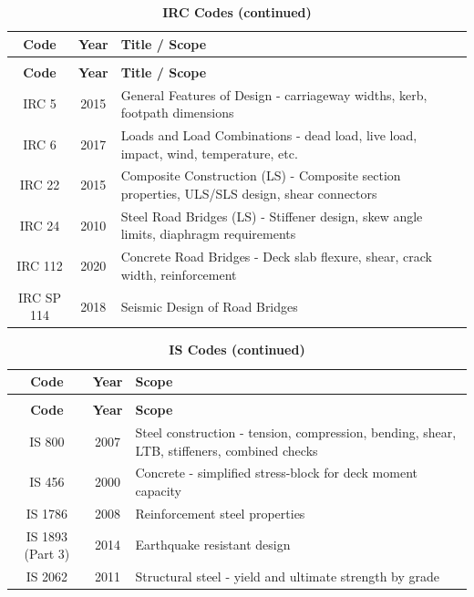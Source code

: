 \documentclass[12pt,a4paper]{report}
\numberwithin{table}{chapter}
\numberwithin{figure}{chapter}
\begin{document}
\vspace{0.5cm}

\begingroup
\setlength{\tabcolsep}{3.5pt}
\begin{longtable}{|c|c|p{13cm}|}
\caption{\textbf{IRC Codes}}\\
\hline
\textbf{Code} & \textbf{Year} & \textbf{Title / Scope} \\[6pt]
\hline
\endfirsthead
\caption[]{\textbf{IRC Codes (continued)}}\\
\hline
\textbf{Code} & \textbf{Year} & \textbf{Title / Scope} \\[6pt]
\hline
\endhead
\hline
\endfoot
\endlastfoot

IRC 5 & 2015 & General Features of Design - carriageway widths, kerb, footpath dimensions \\[6pt]
\hline
IRC 6 & 2017 & Loads and Load Combinations - dead load, live load, impact, wind, temperature, etc. \\[6pt]
\hline
IRC 22 & 2015 & Composite Construction (LS) - Composite section properties, ULS/SLS design, shear connectors \\[6pt]
\hline
IRC 24 & 2010 & Steel Road Bridges (LS) - Stiffener design, skew angle limits, diaphragm requirements \\[6pt]
\hline
IRC 112 & 2020 & Concrete Road Bridges - Deck slab flexure, shear, crack width, reinforcement \\[6pt]
\hline
IRC SP 114 & 2018 & Seismic Design of Road Bridges \\[6pt]
\hline
\end{longtable}
\endgroup

\begingroup
\setlength{\tabcolsep}{3.5pt}
\begin{longtable}{|c|c|p{13cm}|}
\caption{\textbf{IS Codes}}\\
\hline
\textbf{Code} & \textbf{Year} & \textbf{Scope} \\[6pt]
\hline
\endfirsthead
\caption[]{\textbf{IS Codes (continued)}}\\
\hline
\textbf{Code} & \textbf{Year} & \textbf{Scope} \\[6pt]
\hline
\endhead
\hline
\endfoot
\endlastfoot

IS 800 & 2007 & Steel construction - tension, compression, bending, shear, LTB, stiffeners, combined checks \\[6pt]
\hline
IS 456 & 2000 & Concrete - simplified stress-block for deck moment capacity \\[6pt]
\hline
IS 1786 & 2008 & Reinforcement steel properties \\[6pt]
\hline
IS 1893 (Part 3) & 2014 & Earthquake resistant design \\[6pt]
\hline
IS 2062 & 2011 & Structural steel - yield and ultimate strength by grade \\[6pt]
\hline
\end{longtable}
\endgroup
\end{document}
